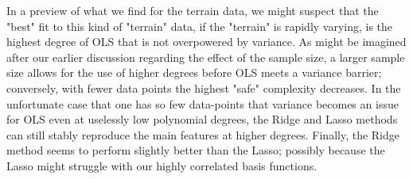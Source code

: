\documentclass[reprint, english, nofootinbib]{revtex4-2}
\begin{document}
In a preview of what we find for the terrain data, we might suspect that the "best" fit to this kind of "terrain" data, if the "terrain" is rapidly varying, is the highest degree of OLS that is not overpowered by variance. As might be imagined after our earlier discussion regarding the effect of the sample size, a larger sample size allows for the use of higher degrees before OLS meets a variance barrier; conversely, with fewer data points the highest "safe" complexity decreases. In the unfortunate case that one has so few data-points that variance becomes an issue for OLS even at uselessly low polynomial degrees, the Ridge and Lasso methods can still stably reproduce the main features at higher degrees. Finally, the Ridge method seems to perform slightly better than the Lasso; possibly because the Lasso might struggle with our highly correlated basis functions.


\end{document}

